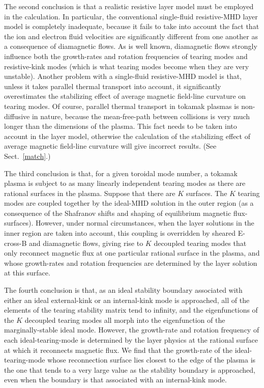 \documentclass[12pt,prb,aps]{revtex4-1}
\providecommand{\DIFadd}[1]{{\protect\color{blue}\uwave{#1}}} %
\providecommand{\DIFaddbegin}{} %
\providecommand{\DIFaddend}{} %
\newcommand{\DIFaddincludegraphics}[2][]{{\color{blue}\fbox{\DIFOincludegraphics[#1]{#2}}}} %
\DeclareRobustCommand{\DIFaddbegin}{\DIFOaddbegin \let\includegraphics\DIFaddincludegraphics} %
\DeclareRobustCommand{\DIFaddend}{\DIFOaddend \let\includegraphics\DIFOincludegraphics} %
\begin{document}
The second conclusion is that a realistic resistive layer model must be employed in the calculation. 
In particular, the conventional single-fluid resistive-MHD layer model is completely inadequate, because it fails to take into account the fact that
the ion and electron fluid velocities are significantly different from one another as a consequence of diamagnetic flows. As is well known,
diamagnetic flows strongly influence both the growth-rates and rotation frequencies of tearing modes and resistive-kink modes (which is
what tearing modes become when they are very unstable).\cite{ara} Another problem with a  single-fluid resistive-MHD model is that,
unless it takes parallel thermal transport into account, it significantly overestimates the stabilizing effect of average magnetic
field-line curvature on tearing modes.\cite{lut,con1}  Of course, parallel thermal transport in tokamak plasmas is
non-diffusive in nature, because the mean-free-path between collisions is very much longer than the dimensions of the plasma.\cite{hel,hel1}
This fact  needs to be taken into account in the layer model, otherwise the calculation of the stabilizing  effect of average magnetic
field-line curvature will give incorrect results. (See Sect.~\ref{match}.)

The third conclusion is that, for a given toroidal mode number, a tokamak plasma is subject to as many linearly independent tearing modes as
there are rational surfaces in the plasma. Suppose that there are $K$ surfaces. The $K$ tearing modes are coupled together by the ideal-MHD solution in the outer region (as a
consequence of the Shafranov shifts and shaping of equilibrium magnetic flux-surfaces). However, under normal circumstances,
when the layer solutions in the inner region are taken into account, 
this coupling is overridden by sheared E-cross-B and diamagnetic flows, giving rise to $K$ decoupled tearing modes that only
reconnect magnetic flux at one particular rational surface in the plasma, and whose growth-rates and rotation frequencies are determined by
the layer solution at this surface.\cite{am1} 

The fourth conclusion is that, as an ideal stability boundary associated with either an ideal external-kink or an internal-kink
mode is approached, all of the elements of the tearing stability matrix tend to infinity, and the eigenfunctions of the $K$ decoupled tearing modes \DIFaddbegin \DIFadd{in the outer region 
}\DIFaddend all morph into the eigenfunction of the marginally-stable ideal mode. However, the growth-rate
and rotation frequency of each ideal-tearing-mode is determined by the layer physics at the rational surface at which it reconnects
magnetic flux. We find that the growth-rate of the ideal-tearing-mode whose reconnection surface lies closest to the edge of the plasma
 is the one that tends to a very large value as the stability boundary is approached, even when the boundary is that associated
with an internal-kink mode. 
\end{document}

